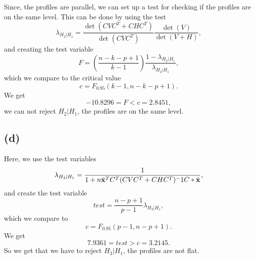 Since, the profiles are parallel, we can set up a test for checking if
the profiles are on the same level. This can be done by using the test
\begin{equation*}
  \lambda_{H_2 | H_1} = \frac{\det(CVC^T + CHC^T)}{\det(CVC^T)}\frac{\det(V)}{\det(V+H)},
\end{equation*}
and creating the test variable 
\begin{equation*}
  F = \left(\frac{n-k - p +1}{k - 1}\right)\frac{1 - \lambda_{H_2 |H_1}}{\lambda_{H_2 | H_1}},
\end{equation*}
which we compare to the critical value
\begin{equation*}
  c = F_{0.95} (k-1, n - k - p +1).
\end{equation*}
We get
\begin{equation*}
  -10.8296 = F < c = 2.8451,
\end{equation*}
we can not reject $H_2 | H_1$, the profiles are on the same level.

\subsection*{(d)}
\label{sec:d-1}

Here, we use the test variables 
\begin{equation*}
  \lambda_{H_3 | H_1} = \frac{1}{1 + n \bar{\bf x}^T C^T (CVC^T +
    CHC^T)^-1C*\bar{\bf x}},
\end{equation*}
and create the test variable
\begin{equation*}
  test = \frac{n - p +1}{p - 1}\lambda_{H_3 |H_1},
\end{equation*}
which we compare to 
\begin{equation*}
  c = F_{0.95}(p-1, n-p+1).
\end{equation*}
We get
\begin{equation*}
  7.9361 = test > c = 3.2145.
\end{equation*}
So we get that we have to reject $H_3 | H_1$, the profiles are not
flat.
